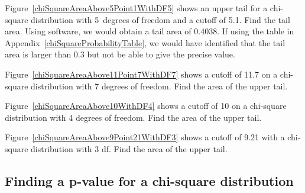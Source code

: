 \begin{examplewrap}
\begin{nexample}{Figure~\ref{chiSquareAreaAbove5Point1WithDF5}
    shows an upper tail for a chi-square distribution with
    5~degrees of freedom and a cutoff of 5.1.
    Find the tail area.}
  Using software, we would obtain a tail area of 0.4038.
  If using the table in Appendix~\ref{chiSquareProbabilityTable},
  we would have identified that the tail area is larger than 0.3
  but not be able to give the precise value.
\end{nexample}
\end{examplewrap}

\begin{exercisewrap}
\begin{nexercise}
Figure~\ref{chiSquareAreaAbove11Point7WithDF7} shows a cutoff
of 11.7 on a chi-square distribution with 7 degrees of freedom.
Find the area of the upper tail.\footnotemark{}
\end{nexercise}
\end{exercisewrap}

\begin{exercisewrap}
\begin{nexercise}
Figure~\ref{chiSquareAreaAbove10WithDF4} shows a cutoff
of 10 on a chi-square distribution with 4 degrees of freedom.
Find the area of the upper tail.\footnotemark{}
\end{nexercise}
\end{exercisewrap}

\begin{exercisewrap}
\begin{nexercise}
Figure~\ref{chiSquareAreaAbove9Point21WithDF3} shows a cutoff
of 9.21 with a chi-square distribution with 3 df.
Find the area of the upper tail.\footnotemark{}
\end{nexercise}
\end{exercisewrap}


\D{\newpage}

\subsection{Finding a p-value for a chi-square distribution}
\label{pValueForAChiSquareTest}

